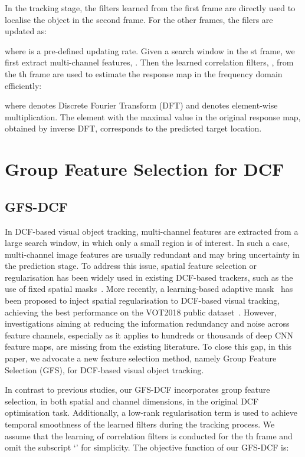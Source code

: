 \documentclass[10pt,twocolumn,letterpaper]{article}
\begin{document}
In the tracking stage, the filters learned from the first frame are directly used to localise the object in the second frame.
For the other frames, the filers are updated as:

where  is a pre-defined updating rate.
Given a search window in the st frame, we first extract multi-channel features, . 
Then the learned correlation filters, , from the th frame are used to estimate the response map in the frequency domain efficiently:

where  denotes Discrete Fourier Transform (DFT) and  denotes element-wise multiplication.
The element with the maximal value in the original response map, obtained by inverse DFT, corresponds to the predicted target location.

\section{Group Feature Selection for DCF}
\subsection{GFS-DCF}
In DCF-based visual object tracking, multi-channel features are extracted from a large search window, in which only a small region is of interest.
In such a case, multi-channel image features are usually redundant and may bring uncertainty in the prediction stage.
To address this issue, spatial feature selection or regularisation has been widely used in existing DCF-based trackers, such as the use of fixed spatial masks~\cite{Galoogahi2017Learning,Lukezic2017Discriminative,li2018learning,Danelljan2016ECO}.
More recently, a learning-based adaptive mask~\cite{xu2018learning} has been proposed to inject spatial regularisation to DCF-based visual tracking, achieving the best performance on the VOT2018 public dataset~\cite{Kristan2018a}.
However, investigations aiming at reducing the information redundancy and noise across feature channels, especially as it applies to hundreds or thousands of deep CNN feature maps, are missing from the existing literature.
To close this gap, in this paper, we advocate a new feature selection method, namely Group Feature Selection (GFS), for DCF-based visual object tracking.

In contrast to previous studies, our GFS-DCF incorporates group feature selection, in both spatial and channel dimensions, in the original DCF optimisation task.
Additionally, a low-rank regularisation term is used to achieve temporal smoothness of the learned filters during the tracking process.
We assume that the learning of correlation filters is conducted for the th frame and omit the subscript `' for simplicity.
The objective function of our GFS-DCF is:
\end{document}
